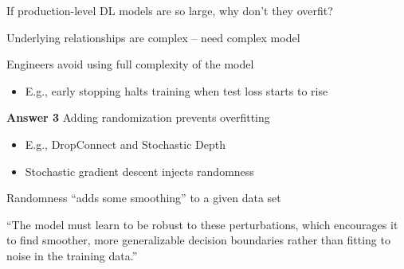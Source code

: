 \documentclass[xcolor=dvipsnames, 10pt]{beamer}
\begin{document}
\begin{frame}
    
    If production-level DL models are so large, why don't they overfit?

        \vspace{0.5em}
        \vspace{0.5em}
        \vspace{0.5em}

     Underlying relationships are complex -- need complex model

        \vspace{0.5em}
        \vspace{0.5em}
     Engineers avoid using full complexity of the model

    \begin{itemize}
        \item E.g., early stopping halts training when test loss starts to rise
    \end{itemize}


\end{frame}

\begin{frame}
    
    \textbf{Answer 3} Adding randomization prevents overfitting

    \begin{itemize}
        \item E.g., DropConnect and Stochastic Depth
        \vspace{0.5em}
        \item Stochastic gradient descent injects randomness
    \end{itemize}

        \vspace{0.5em}
        \vspace{0.5em}

    Randomness ``adds some smoothing'' to a given data set

        \vspace{0.5em}
    ``The model must learn to be robust to these perturbations, which encourages
    it to find smoother, more generalizable decision boundaries rather than
    fitting to noise in the training data.'' 



\end{frame}
\end{document}
